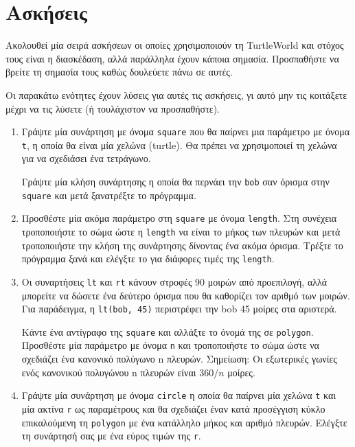 \documentclass[10pt]{book}
\begin{document}
\section{Ασκήσεις}

Ακολουθεί μία σειρά ασκήσεων οι οποίες χρησιμοποιούν τη TurtleWorld και στόχος τους είναι η διασκέδαση, αλλά παράλληλα έχουν κάποια σημασία. Προσπαθήστε να βρείτε τη σημασία τους καθώς δουλεύετε πάνω σε αυτές.

Οι παρακάτω ενότητες έχουν λύσεις για αυτές τις ασκήσεις, γι αυτό μην τις κοιτάξετε μέχρι να τις λύσετε (ή τουλάχιστον να προσπαθήστε).

\begin{enumerate}

\item Γράψτε μία συνάρτηση με όνομα {\tt square} που θα παίρνει μια παράμετρο με όνομα {\tt t}, η οποία θα είναι μία χελώνα (turtle). Θα πρέπει να χρησιμοποιεί τη χελώνα για να σχεδιάσει
ένα τετράγωνο.

Γράψτε μία κλήση συνάρτησης η οποία θα περνάει την {\tt bob} 
σαν όρισμα στην {\tt square} και μετά ξανατρέξτε το πρόγραμμα.

\item Προσθέστε μία ακόμα παράμετρο στη {\tt square} με όνομα {\tt length}. 
Στη συνέχεια τροποποιήστε το σώμα ώστε η {\tt length} να είναι το μήκος των πλευρών και μετά τροποποιήστε την κλήση της συνάρτησης δίνοντας ένα ακόμα όρισμα. Τρέξτε το πρόγραμμα ξανά και ελέγξτε το για διάφορες τιμές της {\tt length}. 

\item Οι συναρτήσεις {\tt lt} και {\tt rt} κάνουν στροφές 90 μοιρών
από προεπιλογή, αλλά μπορείτε να δώσετε ένα δεύτερο όρισμα που θα
καθορίζει τον αριθμό των μοιρών. Για παράδειγμα, η {\tt lt(bob, 45)} περιστρέφει την bob 45 μοίρες στα αριστερά.

Κάντε ένα αντίγραφο της {\tt square} και αλλάξτε το όνομά της σε 
{\tt polygon}. Προσθέστε μία παράμετρο με όνομα {\tt n} και
τροποποιήστε το σώμα ώστε να σχεδιάζει ένα κανονικό πολύγωνο n πλευρών.
Σημείωση: Οι εξωτερικές γωνίες ενός κανονικού πολυγώνου n πλευρών είναι
$360/n$ μοίρες.

\item Γράψτε μία συνάρτηση με όνομα {\tt circle} η οποία θα παίρνει μία χελώνα {\tt t} και μία ακτίνα {\tt r} ως παραμέτρους και θα σχεδιάζει έναν κατά προσέγγιση κύκλο επικαλούμενη τη {\tt polygon} με ένα κατάλληλο μήκος και αριθμό πλευρών. Ελέγξτε τη συνάρτησή σας με ένα εύρος τιμών της {\tt r}.


\end{enumerate}
\end{document}
